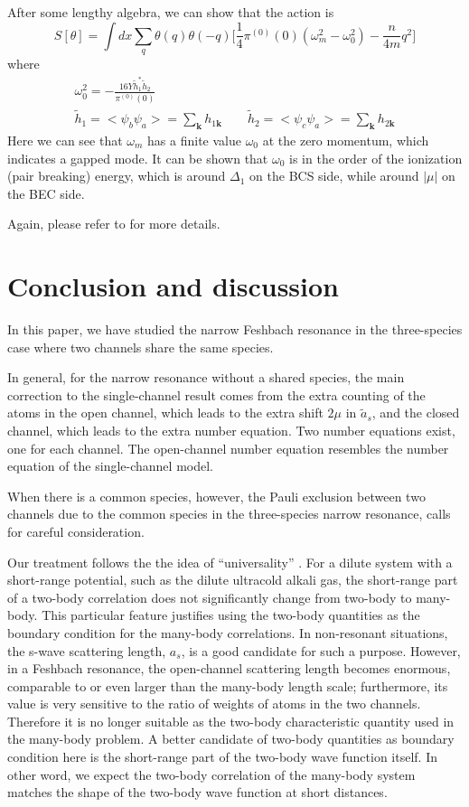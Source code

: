\documentclass[reprint,pra]{revtex4-1}
\newcommand{\vk}{\ensuremath{\mathbf{k}}}
\newcommand{\nth}[1]{\ensuremath{\frac{1}{#1}}}
\providecommand{\abs}[1]{\ensuremath{\left\lvert{#1}\right\rvert}}
\newcommand{\av}[1]{\ensuremath{\bigl<{#1}\bigr>}}
\begin{document}
  After some lengthy algebra, we can show that the action is 
\begin{equation}\label{eq:pathInt2:outofphase}
S[\theta]=\int{dx}\sum_{q}\theta(q)\theta(-q)\big[\nth{4}\pi^{(0)}(0)(\omega_m^2-\omega_{0}^{2})-\frac{n}{4m}q^2\big]
\end{equation}
where
\begin{gather*}
\omega_{0}^{2}=-\frac{16Y\tilde{h}_{1}^{*}\tilde{h}_{2}}{\pi^{(0)}(0)}\\
 \tilde{h}_{1}=\av{\psi_{b}\psi_{a}}=\sum_{\vk}h_{1\vk}\qquad
\tilde{h}_{2}=\av{\psi_{c}\psi_{a}}=\sum_{\vk}h_{2\vk}
 \end{gather*}
Here we can see that  $\omega_{m}$ has a finite value $\omega_{0}$ at the zero momentum, which indicates a gapped mode. It can be shown that $\omega_{0}$
 is in the order of the ionization (pair breaking) energy, which is around $\Delta_1$ on the BCS side, while around $\abs{\mu}$ on the BEC side. 

Again, please refer to \cite{Zhuthesis} for more details. 
\section{Conclusion  and discussion\label{sec:conclusion}}
In this paper, we have studied the narrow Feshbach resonance in  the three-species case where two channels share the same species.  

In general, for the narrow resonance without a shared species, the main correction to the single-channel result comes from the  extra counting of the atoms in the open channel, which leads to the extra shift $2\mu$ in $\tilde{a}_{s}$, and the closed channel, which leads to the extra number equation.  Two number equations exist, one for each channel.  The open-channel number equation resembles the number equation of the single-channel model.

When there is a common species,  however, the  Pauli exclusion between two channels due to the common species in the three-species narrow resonance, calls for careful  consideration. 

  Our treatment follows the the  idea of ``universality'' \cite{Tan2008-1,shizhongUniv}.  For a dilute system with a short-range potential, such as the dilute ultracold alkali gas, the short-range part of a two-body correlation does not significantly change from two-body  to many-body.  This particular feature justifies using the two-body quantities  as the boundary condition for the many-body correlations.  In non-resonant situations, the s-wave scattering length, $a_s$, is a good candidate for such a purpose.  However, in a Feshbach resonance, the open-channel scattering length becomes enormous, comparable to or even larger than the many-body length scale; furthermore, its value is very sensitive to the ratio of weights of atoms in the two channels.  Therefore it is no longer suitable as the two-body characteristic quantity used in  the many-body problem. A better candidate of two-body quantities as boundary condition here is the short-range part of the two-body wave function itself.  In other word, we expect the two-body correlation of the many-body system matches the shape of the two-body wave function  at short distances.  
  
\end{document}
